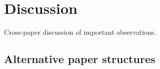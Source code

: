 \section{Discussion}
Cross-paper discussion of important observations.


\subsection{Alternative paper structures}
